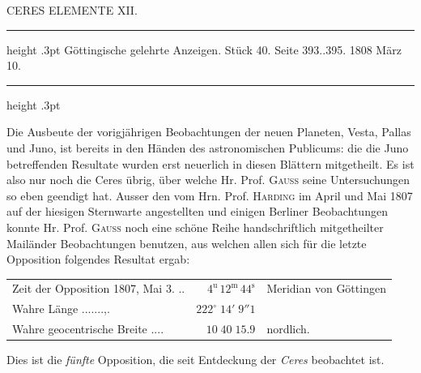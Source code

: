 \par\bigskip
{}
\hypertarget{native-304-lower}{}
\begin{center}
\large CERES ELEMENTE XII.
\end{center}

\begin{center}
\parbox{.76\linewidth}{%
\centering\fontsize{8.2}{10.2}\selectfont
\hrule height .3pt\relax\vspace{2.5pt}
Göttingische gelehrte Anzeigen. Stück 40. Seite 393..395. 1808 März 10.\par
\vspace{2.5pt}\hrule height .3pt\relax
}
\end{center}

\par\indent Die Ausbeute der vorigjährigen Beobachtungen der neuen Planeten, Vesta, Pallas und Juno, ist
bereits in den Händen des astronomischen Publicums: die die Juno betreffenden Resultate wurden
erst neuerlich in diesen Blättern mitgetheilt. Es ist also nur noch die Ceres übrig, über welche
Hr. Prof. \textsc{Gauss} seine Untersuchungen so eben geendigt hat. Ausser den vom Hrn. Prof.
\textsc{Harding} im April und Mai 1807 auf der hiesigen Sternwarte angestellten und einigen
Berliner Beobachtungen konnte Hr. Prof. \textsc{Gauss} noch eine schöne Reihe handschriftlich
mitgetheilter Mailänder Beobachtungen benutzen, aus welchen allen sich für die letzte Opposition
folgendes Resultat ergab:


\begin{center}\fontsize{10}{12}\selectfont\setlength{\tabcolsep}{2pt}\renewcommand{\arraystretch}{1.15}\begin{tabular}{@{}lrl@{}}
Zeit der Opposition 1807, Mai 3. .\;.\; & $4^{\text{u}}\,12^{\text{m}}\,44^{\text{s}}$ & Meridian von Göttingen\\
Wahre Länge .\;.\;.\;.\;.\;.\;.\;,\;.\; & $222^\circ\;14'\;9''1$ & \\
Wahre geocentrische Breite .\;.\;.\;.\; & $10\;40\;15.9$ & nordlich.\\
\end{tabular}\end{center}

\noindent Dies ist die \emph{fünfte} Opposition, die seit Entdeckung der \emph{Ceres} beobachtet ist.


